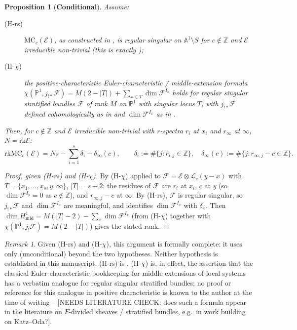 \documentclass[11pt,reqno]{amsart}
\newcommand{\NEEDSLITERATURECHECK}[1]{{\color{green!40!black}\textsf{[NEEDS
LITERATURE CHECK: #1]}}}
\newcommand{\ZZ}{\mathbb{Z}}
\newcommand{\PP}{\mathbb{P}}
\newcommand{\AAA}{\mathbb{A}}
\newcommand{\cE}{\mathcal{E}}
\newcommand{\cF}{\mathcal{F}}
\newcommand{\cL}{\mathcal{L}}
\newcommand{\rk}{\mathrm{rk}}
\newcommand{\MC}{\mathrm{MC}}
\theoremstyle{plain}
\newtheorem{proposition}[theorem]{Proposition}
\theoremstyle{definition}
\theoremstyle{remark}
\newtheorem{remark}[theorem]{Remark}
\numberwithin{equation}{section}
\begin{document}
\begin{proposition}[\textbf{Conditional}]\label{prop:MCrank}
Assume:
\begin{description}
\item[(H-rs)] $\MC_c(\cE)$, as constructed in , is regular
      singular on $\AAA^1\setminus S$ for $c\notin\ZZ$ and $\cE$
      irreducible non-trivial (this is exactly );
\item[(H-$\chi$)] the positive-characteristic Euler-characteristic /
      middle-extension formula
      $\chi(\PP^1,j_{!*}\cF)=M(2-|T|)+\sum_{x\in T}\dim\cF^{I_x}$ holds
      for regular singular stratified bundles $\cF$ of rank $M$ on
      $\PP^1$ with singular locus $T$, with $j_{!*}\cF$ defined
      cohomologically as in  and $\dim\cF^{I_x}$ as in
      .
\end{description}
Then, for $c\notin\ZZ$ and $\cE$ irreducible non-trivial with $r$-spectra
$r_i$ at $x_i$ and $r_\infty$ at $\infty$, $N=\rk\cE$:
\[
   \rk\MC_c(\cE)=Ns-\sum_{i=1}^s\delta_i-\delta_\infty(c),
   \qquad
   \delta_i:=\#\{j: r_{i,j}\in\ZZ\},\quad
   \delta_\infty(c):=\#\{j: r_{\infty,j}-c\in\ZZ\}.
\]
\end{proposition}
\begin{proof}[Proof, given (H-rs) and (H-$\chi$)]
By (H-$\chi$) applied to $\cF=\cE\otimes\cL_c(y-x)$ with
$T=\{x_1,\dots,x_s,y,\infty\}$, $|T|=s+2$: the residues of $\cF$ are
$r_i$ at $x_i$, $c$ at $y$ (so $\dim\cF^{I_y}=0$ as $c\notin\ZZ$), and
$r_{\infty,j}-c$ at $\infty$.  By (H-rs), $\cF$ is regular singular, so
$j_{!*}\cF$ and $\dim\cF^{I_x}$ are meaningful, and 
identifies $\dim\cF^{I_x}$ with $\delta_x$.  Then
$\dim H^1_{\mathrm{mid}}=M(|T|-2)-\sum_x\dim\cF^{I_x}$ (from (H-$\chi$)
together with $\chi(\PP^1,j_!\cF)=M(2-|T|)$) gives the stated rank.
\end{proof}

\begin{remark}
Given (H-rs) and (H-$\chi$), this argument is formally complete: it uses
only  (unconditional) beyond the two hypotheses.
Neither hypothesis is established in this manuscript.  (H-rs) is
.  (H-$\chi$) is, in effect, the assertion that the
classical Euler-characteristic bookkeeping for middle extensions of local
systems has a verbatim analogue for regular singular stratified bundles;
no proof or reference for this analogue in positive characteristic is
known to the author at the time of writing --
\NEEDSLITERATURECHECK{does such a formula appear in the literature on
$F$-divided sheaves / stratified bundles, e.g.\ in work building on
Katz--Oda?}.
\end{remark}
\end{document}
